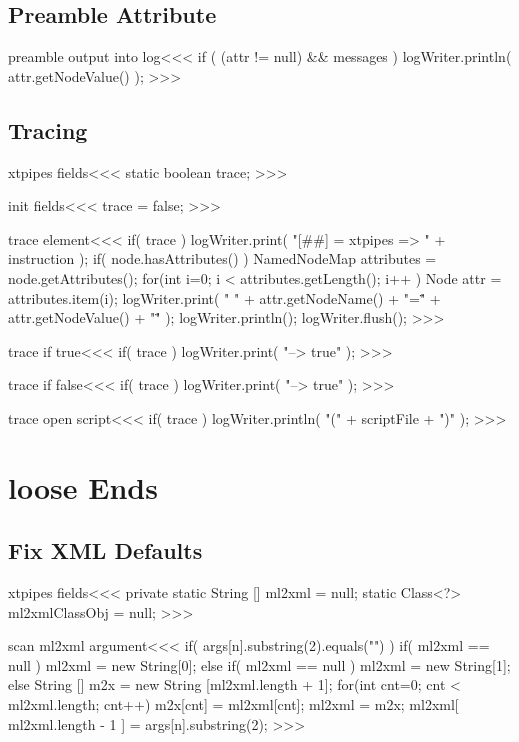 \documentclass{article}
\begin{document}
\subsection{Preamble Attribute}

\<preamble output into log\><<<
if ( (attr != null) && messages ) {
   logWriter.println( attr.getNodeValue() );
}
>>>



\subsection{Tracing}


\<xtpipes fields\><<<
static boolean trace;
>>>

\<init fields\><<<
trace = false;
>>>



\<trace element\><<<
if( trace ){
   logWriter.print( "[##] = xtpipes => " + instruction );
   if( node.hasAttributes() ){
      NamedNodeMap attributes = node.getAttributes();
      for(int i=0; i < attributes.getLength(); i++ ){
         Node attr = attributes.item(i);
         logWriter.print( " "   + attr.getNodeName()
                         + "=\"" + attr.getNodeValue() + "\"" );
   } }
   logWriter.println(); logWriter.flush();
}
>>>

\<trace if true\><<<
if( trace ){
   logWriter.print( "--> true" );
}
>>>

\<trace if false\><<<
if( trace ){
   logWriter.print( "--> true" );
}
>>>


\<trace open script\><<<
if( trace ){
   logWriter.println( "(" + scriptFile + ")" );
}
>>>



\section{loose Ends}

\subsection{Fix XML Defaults}

\<xtpipes fields\><<<
private static String [] ml2xml = null;
static Class<?> ml2xmlClassObj = null;
>>>

\<scan ml2xml argument\><<<
if( args[n].substring(2).equals("") ){
   if( ml2xml == null ){ ml2xml = new String[0]; }
} else {
   if( ml2xml == null ){
      ml2xml = new String[1];
   } else {
      String [] m2x = new String [ml2xml.length + 1];
      for(int cnt=0; cnt < ml2xml.length; cnt++){
        m2x[cnt] = ml2xml[cnt];
      }
      ml2xml = m2x;
   }
   ml2xml[ ml2xml.length - 1 ] = args[n].substring(2);
}
>>>
\end{document}
